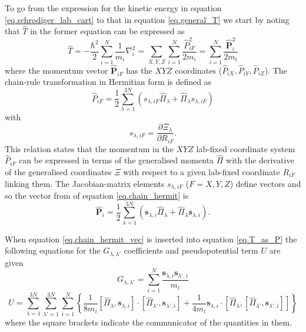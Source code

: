 To go from the expression for the kinetic energy in equation \ref{eq.schrodiger_lab_cart} to that in equation
\ref{eq.general_T} we start by noting that $\hat{T}$ in the former equation can be expressed as 
\begin{equation}
\label{eq.T_as_P}
\hat{T} = -\frac{\hbar^2}{2} \sum_{i=1}^N \frac{1}{m_i} \nabla^2_i = \sum_{X,Y,Z} \sum_{i=1}^{N} 
\frac{\hat{P}^2_{iF}}{2m_i} = \sum_{i=1}^N \frac{\hat{\mathbf{P}}_i^2}{2m_i}
\end{equation}
where the momentum vector $\hat{\mathbf{P}}_{iF}$ has the $XYZ$ coordinates ($\hat{P}_{iX}, \hat{P}_{iY}, \hat{P}_{iZ}$).
The chain-rule transformation in Hermitian form is defined as
\begin{equation}
\label{eq.chain_hermit}
\hat{P}_{iF} = \frac{1}{2} \sum_{\lambda = 1}^{3N} \left( s_{\lambda,iF} \hat{\Pi}_{\lambda} + \hat{\Pi}_{\lambda} 
s_{\lambda,iF} \right) 
\end{equation}
with
\begin{equation}
\label{eq.def_s}
s_{\lambda,iF} = \frac{\partial \Xi_{\lambda} }{\partial R_{iF} }.
\end{equation}
This relation states that the momentum in the $XYZ$ lab-fixed coordinate system $\hat{P}_{iF}$ can be expressed in terms
of the generalised momenta $\hat{\Pi}$ with the derivative of the generalised coordinates $\Xi$ with respect to a given 
lab-fixed coordinate $R_{iF}$ linking them. The Jacobian-matrix elements $s_{\lambda,iF}$ ($F = X,Y,Z$) define vectors and so
the vector from of equation \ref{eq.chain_hermit} is
\begin{equation}
\label{eq.chain_hermit_vec}
\hat{\mathbf{P}}_i = \frac{1}{2} \sum_{\lambda = 1}^{3N} \left(\mathbf{s}_{\lambda,i} \hat{\Pi}_{\lambda} +
\hat{\Pi}_{\lambda} \mathbf{s}_{\lambda,i} \right). 
\end{equation} 

When equation \ref{eq.chain_hermit_vec} is inserted into equation \ref{eq.T_as_P} the following equations for the 
$G_{\lambda,\lambda'}$ coefficients and pseudopotential term $U$ are given
\begin{equation}
\label{eq.G_with_s}
G_{\lambda,\lambda'} = \sum_{i=1}^N \frac{\mathbf{s}_{\lambda,i} \mathbf{s}_{\lambda',i}}{m_i}
\end{equation}
\begin{equation}
\label{eq.U_with_s}
U = \sum_{\lambda=1}^{3N} \sum_{\lambda'=1}^{3N} \sum_{i=1}^N \left\{  \frac{1}{8m_i} \left[\hat{\Pi}_{\lambda},
\mathbf{s}_{\lambda,i} \right] \cdot \left[\hat{\Pi}_{\lambda'},\mathbf{s}_{\lambda',i} \right] 
+ \frac{1}{4 m_i} \mathbf{s}_{\lambda,i} \cdot \left[\hat{\Pi}_{\lambda}, \left[\hat{\Pi}_{\lambda'},\mathbf{s}_{\lambda',i}
\right] \right] \right \}
\end{equation}
where the square brackets indicate the communicator of the quantities in them. 

